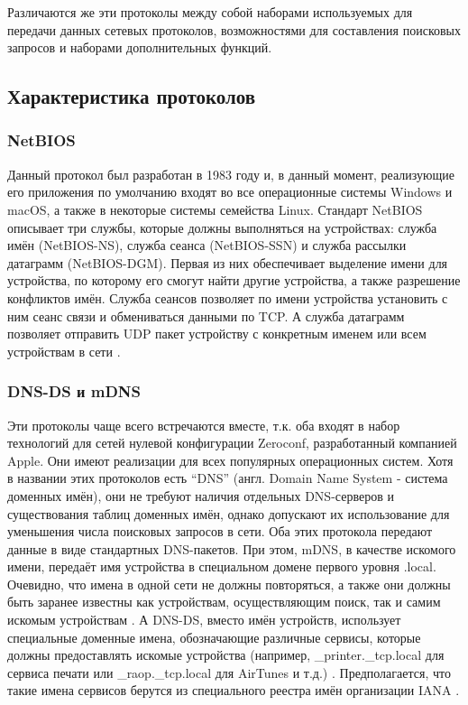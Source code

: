 
Различаются же эти протоколы между собой наборами используемых для передачи данных сетевых протоколов, возможностями для составления поисковых запросов и наборами дополнительных функций.

\subsection{Характеристика протоколов}

\subsubsection{NetBIOS}
Данный протокол был разработан в 1983 году и, в данный момент, реализующие его приложения по умолчанию входят во все операционные системы Windows и macOS, а также в некоторые системы семейства Linux.
Стандарт NetBIOS описывает три службы, которые должны выполняться на устройствах: служба имён (NetBIOS-NS), служба сеанса (NetBIOS-SSN) и служба рассылки датаграмм (NetBIOS-DGM).
Первая из них обеспечивает выделение имени для устройства, по которому его смогут найти другие устройства, а также разрешение конфликтов имён.
Служба сеансов позволяет по имени устройства установить с ним сеанс связи и обмениваться данными по TCP.
А служба датаграмм позволяет отправить UDP пакет устройству с конкретным именем или всем устройствам в сети \cite{web:netbios}.

\subsubsection{DNS-DS и mDNS}
Эти протоколы чаще всего встречаются вместе, т.к. оба входят в набор технологий для сетей нулевой конфигурации Zeroconf, разработанный компанией Apple.
Они имеют реализации для всех популярных операционных систем.
Хотя в названии этих протоколов есть "`DNS"' (англ. Domain Name System - система доменных имён), они не требуют наличия отдельных DNS-серверов и существования таблиц доменных имён, однако допускают их использование для уменьшения числа поисковых запросов в сети.
Оба этих протокола передают данные в виде стандартных DNS-пакетов.
При этом, mDNS, в качестве искомого имени, передаёт имя устройства в специальном домене первого уровня .local.
Очевидно, что имена в одной сети не должны повторяться, а также они должны быть заранее известны как устройствам, осуществляющим поиск, так и самим искомым устройствам \cite{web:dns-ds,web:mdns}.
А DNS-DS, вместо имён устройств, использует специальные доменные имена, обозначающие различные сервисы, которые должны предоставлять искомые устройства (например, {\_}printer.{\_}tcp.local для сервиса печати или {\_}raop.{\_}tcp.local для AirTunes и т.д.) \cite{web:dns-ds, book:zero-conf-guide}.
Предполагается, что такие имена сервисов берутся из специального реестра имён организации IANA \cite{web:iana-dns-ds}.

